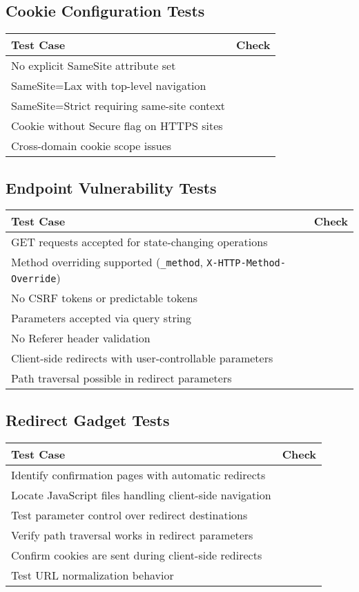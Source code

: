 \documentclass{article}
\begin{document}
\subsection*{Cookie Configuration Tests}
\begin{tabular}{>{\raggedright\arraybackslash}p{}c}
    \toprule
    \textbf{Test Case} & \textbf{Check} \\
    \midrule
    No explicit SameSite attribute set  \\
    SameSite=Lax with top-level navigation  \\
    SameSite=Strict requiring same-site context  \\
    Cookie without Secure flag on HTTPS sites  \\
    Cross-domain cookie scope issues \\
    \bottomrule
\end{tabular}

\subsection*{Endpoint Vulnerability Tests}
\begin{tabular}{>{\raggedright\arraybackslash}p{}c}
    \toprule
    \textbf{Test Case} & \textbf{Check} \\
    \midrule
    GET requests accepted for state-changing operations \\
    Method overriding supported (\texttt{\_method}, \texttt{X-HTTP-Method-Override})  \\
    No CSRF tokens or predictable tokens  \\
    Parameters accepted via query string \\
    No Referer header validation  \\
    Client-side redirects with user-controllable parameters  \\
    Path traversal possible in redirect parameters \\
    \bottomrule
\end{tabular}

\subsection*{Redirect Gadget Tests}
\begin{tabular}{>{\raggedright\arraybackslash}p{}c}
    \toprule
    \textbf{Test Case} & \textbf{Check} \\
    \midrule
    Identify confirmation pages with automatic redirects &  \\
    Locate JavaScript files handling client-side navigation  \\
    Test parameter control over redirect destinations & \\
    Verify path traversal works in redirect parameters & \\
    Confirm cookies are sent during client-side redirects  \\
    Test URL normalization behavior\\
    \bottomrule
\end{tabular}
\end{document}
